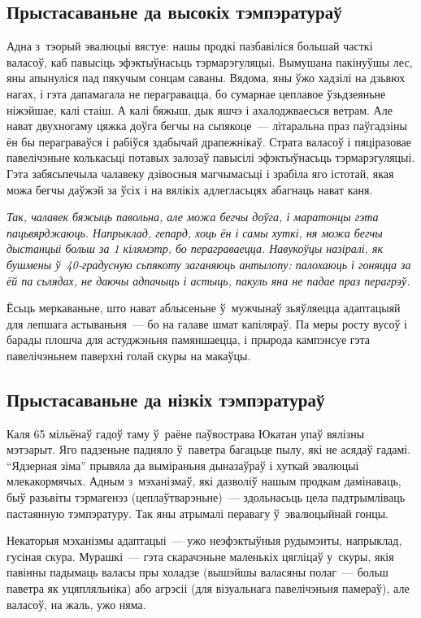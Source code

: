 \subsection*{Прыстасаваньне да высокіх тэмпэратураў}

Адна з~тэорый эвалюцыі вястуе: нашы продкі пазбавіліся большай часткі валасоў, каб павысіць эфэктыўнасьць тэрмарэгуляцыі. Вымушана пакінуўшы лес, яны апынуліся пад пякучым сонцам саваны. Вядома, яны ўжо хадзілі на дзьвюх нагах, і гэта дапамагала не перагравацца, бо сумарнае цеплавое ўзьдзеяньне ніжэйшае, калі стаіш. А калі бяжыш, дык яшчэ і ахалоджваесься ветрам. Але нават двухногаму цяжка доўга бегчы на сьпякоце~--- літаральна праз паўгадзіны ён бы пераграваўся і рабіўся здабычай драпежнікаў. Страта валасоў і пяціразовае павелічэньне колькасьці потавых залозаў павысілі эфэктыўнасьць тэрмарэгуляцыі. Гэта забясьпечыла чалавеку дзівосныя магчымасьці і зрабіла яго істотай, якая можа бегчы даўжэй за ўсіх і на вялікіх адлегласьцях абагнаць нават каня.

\emph{Так, чалавек бяжыць павольна, але можа бегчы доўга, і маратонцы гэта пацьвярджаюць. Напрыклад, гепард, хоць ён і самы хуткі, ня можа бегчы дыстанцыі больш за 1 кілямэтр, бо пераграваецца. Навукоўцы назіралі, як бушмены ў~40-градусную сьпякоту заганяюць антылопу: палохаюць і гоняцца за ёй па сьлядах, не даючы адпачыць і астыць, пакуль яна не падае праз перагрэў.}

Ёсьць меркаваньне, што нават аблысеньне ў~мужчынаў зьяўляецца адаптацыяй для лепшага астываньня~--- бо на галаве шмат капіляраў. Па меры росту вусоў і барады плошча для астуджэньня памяншаецца, і прырода кампэнсуе гэта павелічэньнем паверхні голай скуры на макаўцы.

\subsection*{Прыстасаваньне да нізкіх тэмпэратураў}

Каля 65 мільёнаў гадоў таму ў~раёне паўвострава Юкатан упаў вялізны мэтэарыт. Яго падзеньне падняло ў~паветра багацьце пылу, які не асядаў гадамі. ``Ядзерная зіма'' прывяла да выміраньня дыназаўраў і хуткай эвалюцыі млекакормячых. Адным з~мэханізмаў, які дазволіў нашым продкам дамінаваць, быў разьвіты тэрмагенэз (цеплаўтварэньне)~--- здольнасьць цела падтрымліваць пастаянную тэмпэратуру. Так яны атрымалі перавагу ў~эвалюцыйнай гонцы.

Некаторыя мэханізмы адаптацыі~--- ужо неэфэктыўныя рудымэнты, напрыклад, гусіная скура. Мурашкі~--- гэта скарачэньне маленькіх цягліцаў у~скуры, якія павінны падымаць валасы пры холадзе (вышэйшы валасяны полаг~--- больш паветра як уцяпляльніка) або агрэсіі (для візуальнага павелічэньня памераў), але валасоў, на жаль, ужо няма.

